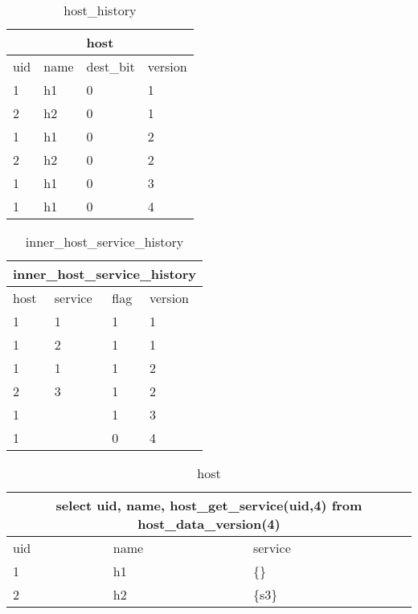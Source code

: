 \documentclass[deska]{subfiles}
\begin{document}
\begin{center}

\begin{table}
    \caption{host\_history}
    \label{tab-multi-hosthist}
\begin{tabular}{ | l | l | l | l |}
    \hline
    \multicolumn{4}{|c|}{host}\\
    \hline
    uid & name & dest\_bit & version\\
    \hline
    1 & h1 & 0 & 1\\
    2 & h2 & 0 & 1\\
    1 & h1 & 0 & 2\\
    2 & h2 & 0 & 2\\
    1 & h1 & 0 & 3\\
    1 & h1 & 0 & 4\\
    \hline
\end{tabular}
\end{table}

\begin{table}
    \caption{inner\_host\_service\_history}
    \label{tab-multi-innerhist}
\begin{tabular}{ | l | l | l | l |}
    \hline
    \multicolumn{4}{|c|}{inner\_host\_service\_history}\\
    \hline
    host & service & flag & version\\
    \hline
    1 & 1 & 1 & 1\\
    1 & 2 & 1 & 1\\
    1 & 1 & 1 & 2\\
    2 & 3 & 1 & 2\\
    1 &  & 1 & 3\\
    1 &  & 0 & 4\\
    \hline
\end{tabular}
\end{table}

\begin{table}
    \caption{host}
    \label{tab-multi-hostv}
\begin{tabular}{ | l | l | l |}
    \hline
    \multicolumn{3}{|c|}{select uid, name, host\_get\_service(uid,4) from host\_data\_version(4)}\\
    \hline
    uid & name & service\\
    \hline
    1 & h1 & \{\}\\
    2 & h2 & \{s3\}\\
    \hline
\end{tabular}
\end{table}

\end{center}
\end{document}

